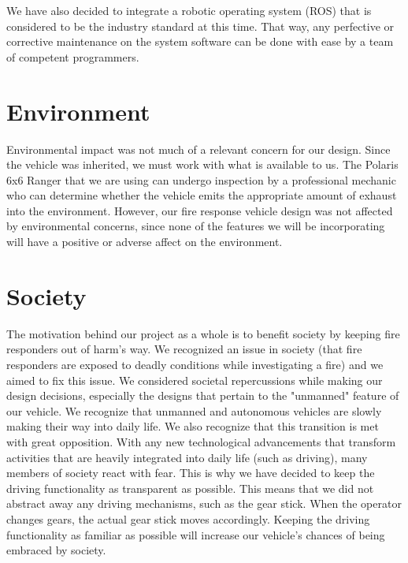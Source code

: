 We have also decided to integrate a robotic operating system (ROS) that is considered to be the industry standard at this time. That way, any perfective or corrective maintenance on the system software can be done with ease by a team of competent programmers. 

\section{Environment} Environmental impact was not much of a relevant concern for our design. Since the vehicle was inherited, we must work with what is available to us. The Polaris 6x6 Ranger that we are using can undergo inspection by a professional mechanic who can determine whether the vehicle emits the appropriate amount of exhaust into the environment. However, our fire response vehicle design was not affected by environmental concerns, since none of the features we will be incorporating will have a positive or adverse affect on the environment. 

\section{Society} The motivation behind our project as a whole is to benefit society by keeping fire responders out of harm's way. We recognized an issue in society (that fire responders are exposed to deadly conditions while investigating a fire) and we aimed to fix this issue. We considered societal repercussions while making our design decisions, especially the designs that pertain to the "unmanned" feature of our vehicle. We recognize that unmanned and autonomous vehicles are slowly making their way into daily life. \cite{autonomouscars} We also recognize that this transition is met with great opposition. With any new technological advancements that transform activities that are heavily integrated into daily life (such as driving), many members of society react with fear. This is why we have decided to keep the driving functionality as transparent as possible. This means that we did not abstract away any driving mechanisms, such as the gear stick. When the operator changes gears, the actual gear stick moves accordingly. Keeping the driving functionality as familiar as possible will increase our vehicle's chances of being embraced by society. 



